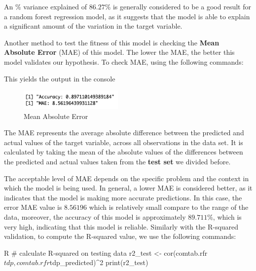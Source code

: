 An $\%$ variance explained of $86.27\%$ is generally considered to be a good result for a random forest regression model, as it suggests that the model is able to explain a significant amount of the variation in the target variable.

Another method to test the fitness of this model is checking the \textbf{Mean Absolute Error} (MAE) of this model. The lower the MAE, the better this model validates our hypothesis. To check MAE, using the following commands:

This yields the output in the console
\begin{figure}[H]
    \centering
    \includegraphics[width=0.45\textwidth]{graphics/MAE.png}
    \caption{Mean Absolute Error}
    \label{fig:MAE}
\end{figure}
The MAE represents the average absolute difference between the predicted and actual values of the target variable, across all observations in the data set. It is calculated by taking the mean of the absolute values of the differences between the predicted and actual values taken from the \textbf{test set} we divided before.

The acceptable level of MAE depends on the specific problem and the context in which the model is being used. In general, a lower MAE is considered better, as it indicates that the model is making more accurate predictions. In this case, the error MAE value is $8.56196$ which is relatively small compare to the range of the data, moreover, the accuracy of this model is approximately $89.711\%$, which is very high, indicating that this model is reliable. Similarly with the R-squared validation, to compute the R-squared value, we use the following commands:
\begin{code}{R}
# calculate R-squared on testing data
r2_test <- cor(comtab.rfr$tdp, comtab.rfr$tdp_predicted)^2
print(r2_test)
\end{code}

